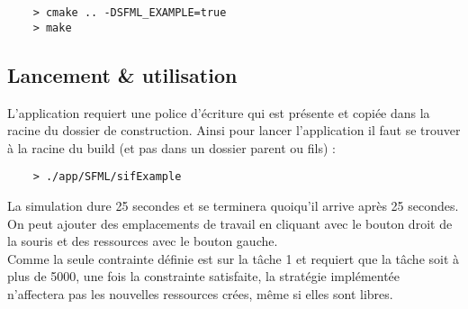 \begin{verbatim}
    > cmake .. -DSFML_EXAMPLE=true
    > make
\end{verbatim}

\subsection{Lancement \& utilisation}

L'application requiert une police d'écriture qui est présente et copiée dans la racine du dossier de construction. Ainsi pour lancer l'application il faut se trouver à la racine du build (et pas dans un dossier parent ou fils) :

\begin{verbatim}
    > ./app/SFML/sifExample
\end{verbatim}

La simulation dure 25 secondes et se terminera quoiqu'il arrive après 25 secondes.\\
On peut ajouter des emplacements de travail en cliquant avec le bouton droit de la souris et des ressources avec le bouton gauche.\\
Comme la seule contrainte définie est sur la tâche 1 et requiert que la tâche soit à plus de 5000, une fois la constrainte satisfaite, la stratégie implémentée n'affectera pas les nouvelles ressources crées, même si elles sont libres.
